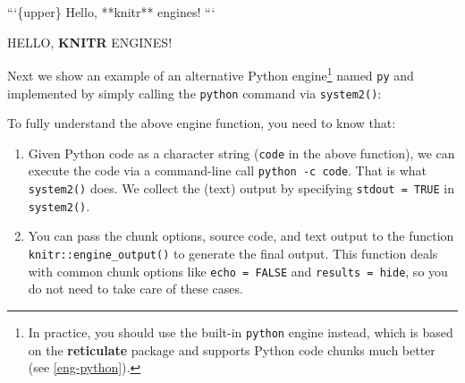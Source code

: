 \documentclass[
  11pt,
]{krantz}
\newenvironment{Shaded}{\begin{snugshade}}{\end{snugshade}}
\newcommand{\BaseNTok}[1]{\textcolor[rgb]{0.06,0.06,0.06}{#1}}
\newcommand{\CharTok}[1]{\textcolor[rgb]{0.5,0.5,0.5}{#1}}
\newcommand{\ControlFlowTok}[1]{\textcolor[rgb]{0.27,0.27,0.27}{\textbf{#1}}}
\newcommand{\DataTypeTok}[1]{\textcolor[rgb]{0.27,0.27,0.27}{#1}}
\newcommand{\KeywordTok}[1]{\textcolor[rgb]{0.27,0.27,0.27}{\textbf{#1}}}
\newcommand{\NormalTok}[1]{#1}
\newcommand{\OperatorTok}[1]{\textcolor[rgb]{0.43,0.43,0.43}{\textbf{#1}}}
\newcommand{\OtherTok}[1]{\textcolor[rgb]{0.37,0.37,0.37}{#1}}
\newcommand{\StringTok}[1]{\textcolor[rgb]{0.5,0.5,0.5}{#1}}
\renewenvironment{quote}{\begin{VF}}{\end{VF}}
\begin{document}
\begin{quote}
\begin{Shaded}
\begin{Highlighting}[]
\BaseNTok{```\{upper\}}
\BaseNTok{Hello, **knitr** engines!}
\BaseNTok{```}
\end{Highlighting}
\end{Shaded}

HELLO, \textbf{KNITR} ENGINES!
\end{quote}

Next we show an example of an alternative Python engine\footnote{In practice, you should use the built-in \texttt{python} engine instead, which is based on the \textbf{reticulate} package and supports Python code chunks much better (see \ref{eng-python}).} named \texttt{py} and implemented by simply calling the \texttt{python} command via \texttt{system2()}:

\begin{Shaded}
\end{Shaded}

To fully understand the above engine function, you need to know that:

\begin{enumerate}
\def\labelenumi{\arabic{enumi}.}
\item
  Given Python code as a character string (\texttt{code} in the above function), we can execute the code via a command-line call \texttt{python\ -c\ \textquotesingle{}code\textquotesingle{}}. That is what \texttt{system2()} does. We collect the (text) output by specifying \texttt{stdout\ =\ TRUE} in \texttt{system2()}.
\item
  You can pass the chunk options, source code, and text output to the function \texttt{knitr::engine\_output()} to generate the final output. This function deals with common chunk options like \texttt{echo\ =\ FALSE} and \texttt{results\ =\ \textquotesingle{}hide\textquotesingle{}}, so you do not need to take care of these cases.
\end{enumerate}
\end{document}
